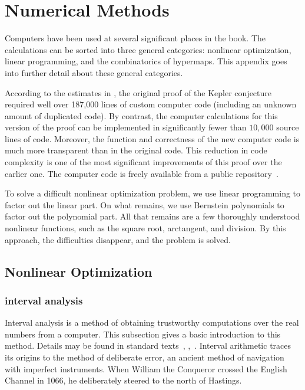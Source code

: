%
\chapter{Numerical Methods}\label{sec:numerical}

Computers have been used at several significant places in the book.
The calculations can be sorted into three general categories:
nonlinear optimization, linear programming, and the combinatorics of
hypermaps. This appendix goes into further detail about these general
categories.

According to the estimates in \cite{HHMNOZ}, the original proof of
the Kepler conjecture required well over 187,000 lines of custom
computer code (including an unknown amount of duplicated code).  By
contrast, the computer calculations for this version of the proof can
be implemented in significantly fewer than $10,000$ source lines of code.
Moreover, the function and correctness of the new computer code is
much more transparent than in the original code.  This reduction in
code complexity is one of the most significant improvements of this
proof over the earlier one.  The computer code is freely available
from a public repository~\cite{website:FlyspeckProject}.

To solve a difficult nonlinear optimization problem, we use linear
programming to factor out the linear part.  On what remains, we use
Bernstein polynomials to factor out the polynomial part.  All that
remains are a few thoroughly understood nonlinear functions, such as
the square root, arctangent, and division.  By this approach, the difficulties
disappear, and the problem is solved.


\section{Nonlinear Optimization}

\subsection{interval analysis}%
\label{sec:bounds-simplex}

Interval analysis is a method of obtaining trustworthy computations
over the real numbers from a computer.  This subsection gives a basic
introduction to this method.  Details may be found in standard
texts~\cite{Kearfott:1996:Interval},
\cite{Moore:1966:IntervalAnalysis},~\cite{Moore:2009:IntroIntAnalysis}.
Interval arithmetic  traces its
origins to the method of deliberate error,  an ancient method
of navigation with imperfect instruments.  When William the Conqueror
crossed the English Channel in 1066, he deliberately steered to the
north of Hastings.

